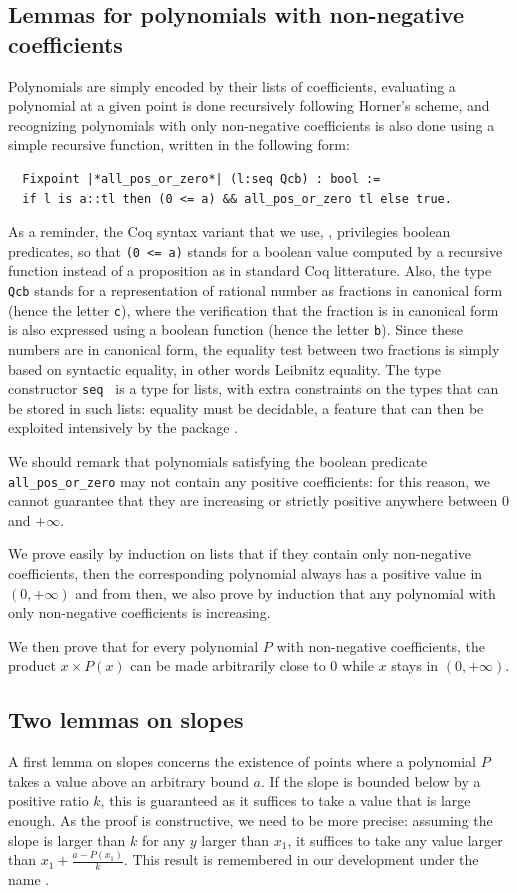 \documentclass{mscs}
\begin{document}
\subsection{Lemmas for polynomials with non-negative coefficients}
Polynomials are simply encoded by their lists of coefficients, evaluating
a polynomial at a given point is done recursively following Horner's scheme,
and recognizing polynomials with only non-negative coefficients is also
done using a simple recursive function, written in the following form:
\begin{lstlisting}
  Fixpoint |*all_pos_or_zero*| (l:seq Qcb) : bool :=
  if l is a::tl then (0 <= a) && all_pos_or_zero tl else true.
\end{lstlisting}
As a reminder, the Coq syntax variant that we use, \ssr{},
privilegies boolean predicates, so that {\tt (0 <= a)} stands for a boolean
value computed by a recursive function instead of a proposition as in
standard Coq litterature.  Also, the type {\tt Qcb} stands for a
representation of
rational number as fractions in canonical form (hence the letter {\tt c}), where
the verification that the fraction is in canonical form is also expressed
using a boolean function (hence the letter {\tt b}).  Since these numbers
are in canonical form, the equality test between two fractions is simply based
on syntactic equality, in other words Leibnitz equality.  The type constructor
{\tt seq } is a type for lists, with extra constraints on the types
that can be
stored in such lists: equality must be decidable, a feature that can then be
exploited intensively by the \ssr{} package
\cite{GONTHIER:2008:INRIA-00258384:4}.

We should remark that polynomials satisfying the boolean predicate
{\tt all\_pos\_or\_zero} may not contain any positive coefficients: for this
reason, we cannot guarantee that they are increasing or strictly positive
anywhere between 0 and \(+\infty\).

We prove easily by induction on lists that if they contain only non-negative
coefficients, then the corresponding polynomial always has a positive value
in \((0,+\infty)\) and from then, we also prove by induction that
any polynomial with only non-negative coefficients is increasing.

We then prove that for every polynomial \(P\)  with non-negative coefficients,
the product \(x \times P(x)\) can be made arbitrarily close to 0 while
$x$ stays in \((0,+\infty)\).

\subsection{Two lemmas on slopes}
A first lemma on slopes concerns the existence of points where a
polynomial \(P\) takes a value above an arbitrary bound \(a\).  If the slope
is bounded below by a positive ratio \(k\), this is guaranteed as it
suffices to take a value that is large enough.  As the proof is
constructive, we need to be more precise: assuming the slope is larger
than \(k\) for any \(y\) larger than \(x_1\), it suffices to take any
value larger than \(x_1 + \frac{a - P(x_1)}{k}\).  This result is
remembered in our development under the name .
\end{document}
